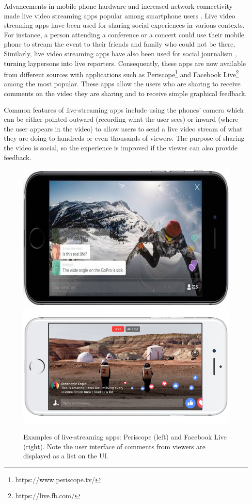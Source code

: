 Advancements in mobile phone hardware and increased network connectivity made live video streaming apps popular among smartphone users \cite{Liu2008}. Live video streaming apps have been used for sharing social experiences in various contexts. For instance, a person attending a conference or a concert could use their mobile phone to stream the event to their friends and family who could not be there. Similarly, live video streaming apps have also been used for social journalism \cite{Lenzner2014}, turning laypersons into live reporters. Consequently, these apps are now available from different sources with applications such as Periscope\footnote{https://www.periscope.tv/} and Facebook Live\footnote{https://live.fb.com/} among the most popular. These apps allow the users who are sharing to receive comments on the video they are sharing and to receive simple graphical feedback. 

Common features of live-streaming apps include using the phones' camera which can be either pointed outward (recording what the user sees) or inward (where the user appears in the video) to allow users to send a live video stream of what they are doing to hundreds or even thousands of viewers. The purpose of sharing the video is social, so the experience is improved if the viewer can also provide feedback.

\begin{figure}
    \centering
    \includegraphics[width=0.4\linewidth]{images/periscope.png}
    \includegraphics[width=0.4\linewidth]{images/facebook-live.png}
    \caption{Examples of live-streaming apps: Periscope (left) and Facebook Live (right). Note the user interface of comments from viewers are displayed as a list on the UI.}
    \label{fig:live-streaming}
\end{figure}

